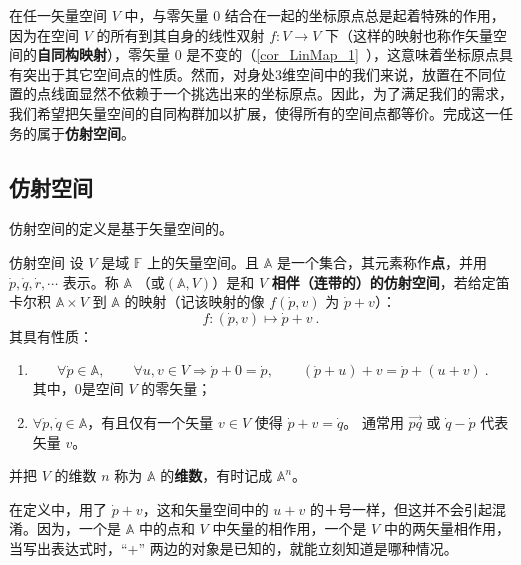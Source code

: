 

在任一矢量空间 $V$ 中，与零矢量 $0$ 结合在一起的坐标原点总是起着特殊的作用，因为在空间 $V$ 的所有到其自身的线性双射 $f:V\rightarrow V$ 下（这样的映射也称作矢量空间的\textbf{自同构映射}），零矢量 $0$ 是不变的（\autoref{cor_LinMap_1}~），这意味着坐标原点具有突出于其它空间点的性质。然而，对身处3维空间中的我们来说，放置在不同位置的点线面显然不依赖于一个挑选出来的坐标原点。因此，为了满足我们的需求，我们希望把矢量空间的自同构群加以扩展，使得所有的空间点都等价。完成这一任务的属于\textbf{仿射空间}。
\subsection{仿射空间}\label{sub_AfSp_1}
仿射空间的定义是基于矢量空间的。
\begin{definition}{仿射空间}\label{def_AfSp_1}
设 $V$ 是域 $\mathbb F$ 上的矢量空间。且 $\mathbb A$ 是一个集合，其元素称作\textbf{点}，并用 $\dot{p},\dot{q},\dot{r},\cdots$ 表示。称 $\mathbb A$ （或$(\mathbb A,V)$）是和 $V$ \textbf{相伴（连带的）的仿射空间}，若给定笛卡尔积 $\mathbb A\times V$ 到 $\mathbb A$ 的映射（记该映射的像 $f(\dot p,v)$ 为 $\dot p+v$）：
\begin{equation}
f:(\dot p,v)\mapsto\dot p+v~.
\end{equation}
其具有性质：
\begin{enumerate}
\item
\begin{equation}
\forall \dot p\in\mathbb A,\qquad
\forall u,v\in V\Rightarrow\dot p+0=\dot p, \qquad
(\dot p+u)+v=\dot p+(u+v)~.
\end{equation}
其中，0是空间 $V$ 的零矢量；
\item $\forall \dot p,\dot q\in\mathbb A$，有且仅有一个矢量 $v\in V$ 使得 $\dot p+v=\dot q$。 通常用 $\overrightarrow{pq}$ 或 $\dot q-\dot p$ 代表矢量 $v$。
\end{enumerate}
并把 $V$ 的维数 $n$ 称为 $\mathbb A$ 的\textbf{维数}，有时记成 $\mathbb A^n$。
\end{definition}
在定义中，用了 $\dot p+v$，这和矢量空间中的 $u+v$ 的＋号一样，但这并不会引起混淆。因为，一个是 $\mathbb A$ 中的点和 $V$ 中矢量的相作用，一个是 $V$ 中的两矢量相作用，当写出表达式时，“+” 两边的对象是已知的，就能立刻知道是哪种情况。

